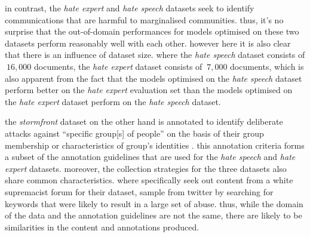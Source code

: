 in contrast, the \textit{hate expert} and \textit{hate speech} datasets seek to identify communications that are harmful to marginalised communities.
thus, it's no surprise that the out-of-domain performances for models optimised on these two datasets perform reasonably well with each other.
however here it is also clear that there is an influence of dataset size. 
where the \textit{hate speech} dataset consists of $~16,000$ documents, the \textit{hate expert} dataset consists of $~7,000$ documents, which is also apparent from the fact that the models optimised on the \textit{hate speech} dataset perform better on the \textit{hate expert} evaluation set than the models optimised on the \textit{hate expert} dataset perform on the \textit{hate speech} dataset.

the \textit{stormfront} dataset on the other hand is annotated to identify deliberate attacks against ``specific group[s] of people'' on the basis of their group membership or characteristics of group's identities \citep{garcia:2019}.
this annotation criteria forms a subset of the annotation guidelines that are used for the \textit{hate speech} and \textit{hate expert} datasets.
moreover, the collection strategies for the three datasets also share common characteristics.
where \citet{garcia:2019} specifically seek out content from a white supremacist forum for their dataset, \citet{waseem:2016,waseem-hovy:2016} sample from twitter by searching for keywords that were likely to result in a large set of abuse. 
thus, while the domain of the data and the annotation guidelines are not the same, there are likely to be similarities in the content and annotations produced.

